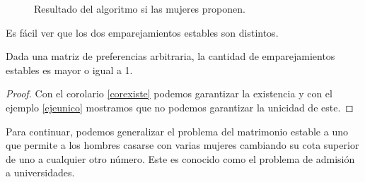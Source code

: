 \begin{eje}
\begin{figure}[H]

\caption{Resultado del algoritmo si las mujeres proponen.}
\end{figure}

Es fácil ver que los dos emparejamientos estables son distintos.
\fin
\end{eje}

\begin{cor}
Dada una matriz de preferencias arbitraria, la cantidad de emparejamientos estables es mayor o igual a 1. 
\end{cor}
\begin{proof}
Con el corolario \ref{corexiste} podemos garantizar la existencia y con el ejemplo \ref{ejeunico} mostramos que no podemos garantizar la unicidad de este.
\end{proof}


Para continuar, podemos generalizar el problema del matrimonio estable a uno que permite a los hombres casarse con varias mujeres cambiando su cota superior de uno a cualquier otro número. Este es conocido como el problema de admisión a universidades. 
